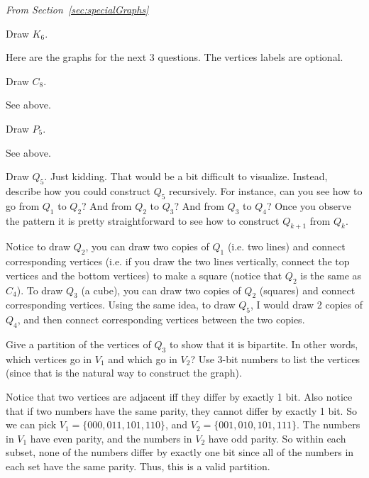 \noindent
{\em From Section~\ref{sec:specialGraphs}}
\begin{requ}
Draw $K_6$.
\begin{requanswer}
Here are the graphs for the next 3 questions.
The vertices labels are optional.

\end{requanswer}
\end{requ}
\begin{requ}
Draw $C_8$.
\begin{requanswer}
See above.
\end{requanswer}
\end{requ}
\begin{requ}
Draw $P_5$.
\begin{requanswer}
See above.
\end{requanswer}
\end{requ}

\begin{requ}
Draw $Q_5$. Just kidding. That would be a bit difficult to visualize. Instead, describe how you could
construct $Q_5$ recursively. For instance, can you see how to go from $Q_1$ to $Q_2$?
And from $Q_2$ to $Q_3$? 
And from $Q_3$ to $Q_4$?  
Once you observe the pattern it is pretty straightforward to see how
to construct $Q_{k+1}$ from $Q_k$.
\begin{requanswer}
Notice to draw $Q_2$, you can draw two copies of $Q_1$ (i.e. two lines) and connect corresponding
vertices (i.e. if you draw the two lines vertically, connect the top vertices and the bottom vertices) to
make a square (notice that $Q_2$ is the same as $C_4$).
To draw $Q_3$ (a cube), you can draw two copies of $Q_2$ (squares) and connect corresponding vertices.
Using the same idea, to draw $Q_5$, 
I would draw 2 copies of $Q_4$, and then connect corresponding vertices between the two copies.
\end{requanswer}
\end{requ}

\begin{requ}
Give a partition of the vertices of $Q_3$ to show that it is bipartite.
In other words, which vertices go in $V_1$ and which go in $V_2$?
Use 3-bit numbers to list the vertices (since that is the natural way to construct the graph).
\begin{requanswer}
Notice that two vertices are adjacent iff they differ by exactly 1 bit.
Also notice that if two numbers have the same parity, they cannot differ by exactly 1 bit.
So we can pick $V_1=\{000,011,101,110\}$, and $V_2=\{001,010,101,111\}$.
The numbers in $V_1$ have even parity, and the numbers in $V_2$ have odd parity.
So within each subset, none of the numbers differ by exactly one bit since all of the numbers in each
set have the same parity. Thus, this is a valid partition.
\end{requanswer}
\end{requ}


